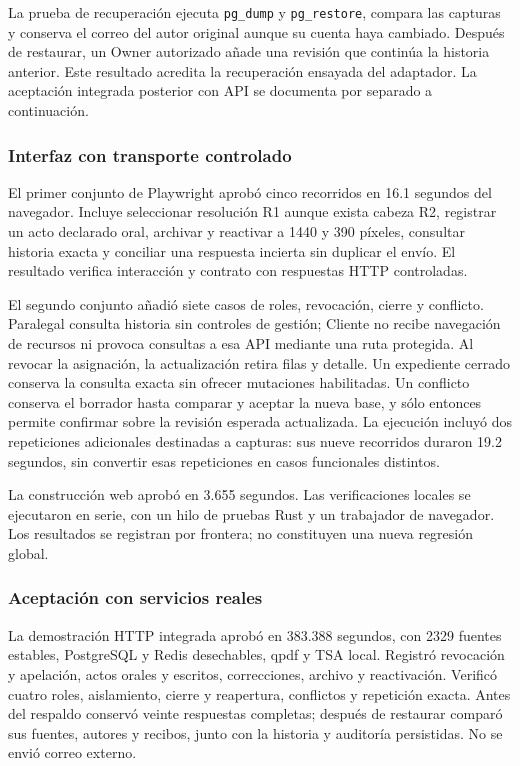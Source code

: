 La prueba de recuperación ejecuta \texttt{pg\_dump} y \texttt{pg\_restore}, compara las capturas y conserva el correo del autor original aunque su cuenta haya cambiado. Después de restaurar, un Owner autorizado añade una revisión que continúa la historia anterior. Este resultado acredita la recuperación ensayada del adaptador. La aceptación integrada posterior con API se documenta por separado a continuación.

\subsubsection{Interfaz con transporte controlado}

El primer conjunto de Playwright aprobó cinco recorridos en 16.1 segundos del navegador. Incluye seleccionar resolución R1 aunque exista cabeza R2, registrar un acto declarado oral, archivar y reactivar a 1440 y 390 píxeles, consultar historia exacta y conciliar una respuesta incierta sin duplicar el envío. El resultado verifica interacción y contrato con respuestas HTTP controladas.

El segundo conjunto añadió siete casos de roles, revocación, cierre y conflicto. Paralegal consulta historia sin controles de gestión; Cliente no recibe navegación de recursos ni provoca consultas a esa API mediante una ruta protegida. Al revocar la asignación, la actualización retira filas y detalle. Un expediente cerrado conserva la consulta exacta sin ofrecer mutaciones habilitadas. Un conflicto conserva el borrador hasta comparar y aceptar la nueva base, y sólo entonces permite confirmar sobre la revisión esperada actualizada. La ejecución incluyó dos repeticiones adicionales destinadas a capturas: sus nueve recorridos duraron 19.2 segundos, sin convertir esas repeticiones en casos funcionales distintos.

La construcción web aprobó en 3.655 segundos. Las verificaciones locales se ejecutaron en serie, con un hilo de pruebas Rust y un trabajador de navegador. Los resultados se registran por frontera; no constituyen una nueva regresión global.

\subsubsection{Aceptación con servicios reales}

La demostración HTTP integrada aprobó en 383.388 segundos, con 2329 fuentes estables, PostgreSQL y Redis desechables, qpdf y TSA local. Registró revocación y apelación, actos orales y escritos, correcciones, archivo y reactivación. Verificó cuatro roles, aislamiento, cierre y reapertura, conflictos y repetición exacta. Antes del respaldo conservó veinte respuestas completas; después de restaurar comparó sus fuentes, autores y recibos, junto con la historia y auditoría persistidas. No se envió correo externo.


